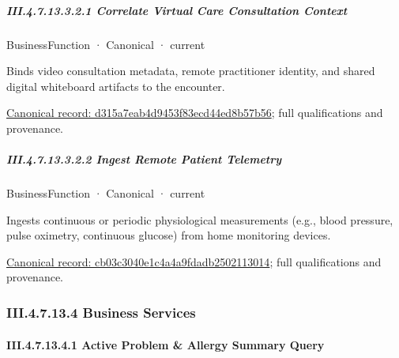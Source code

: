 \subparagraph*{III.4.7.13.3.2.1 Correlate Virtual Care Consultation Context}
\label{navigation:III.4.7.13.3.2.1}

\label{element:d315a7eab4d9453f83ecd44ed8b57b56}
{\small BusinessFunction · Canonical · current}\par

Binds video consultation metadata, remote practitioner identity, and shared digital whiteboard artifacts to the encounter.


{\footnotesize \href{../../../../../../../continuum/business/business-function/d315a7eab4d9453f83ecd44ed8b57b56.md}{Canonical record: d315a7eab4d9453f83ecd44ed8b57b56}; full qualifications and provenance.}\par
\subparagraph*{III.4.7.13.3.2.2 Ingest Remote Patient Telemetry}
\label{navigation:III.4.7.13.3.2.2}

\label{element:cb03c3040e1c4a4a9fdadb2502113014}
{\small BusinessFunction · Canonical · current}\par

Ingests continuous or periodic physiological measurements (e.g., blood pressure, pulse oximetry, continuous glucose) from home monitoring devices.


{\footnotesize \href{../../../../../../../continuum/business/business-function/cb03c3040e1c4a4a9fdadb2502113014.md}{Canonical record: cb03c3040e1c4a4a9fdadb2502113014}; full qualifications and provenance.}\par
\subsubsection*{III.4.7.13.4 Business Services}
\label{navigation:III.4.7.13.4}

\paragraph*{III.4.7.13.4.1 Active Problem \& Allergy Summary Query}
\label{navigation:III.4.7.13.4.1}

